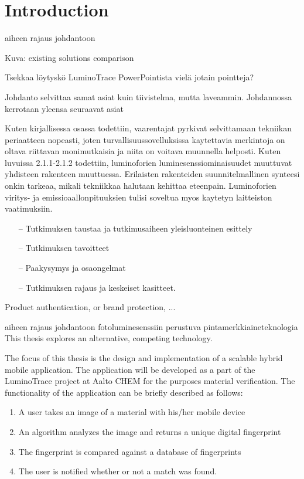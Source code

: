 \documentclass[thesis.tex]{subfiles}
\begin{document}
\chapter{Introduction}
\label{chapter:intro}

aiheen rajaus johdantoon

Kuva: existing solutions comparison

Tsekkaa löytyskö LuminoTrace PowerPointista vielä jotain pointteja?

Johdanto selvittaa samat asiat kuin tiivistelma, mutta laveammin. Johdannossa kerrotaan yleensa seuraavat asiat

Kuten kirjallisessa osassa todettiin, vaarentajat pyrkivat selvittamaan tekniikan periaatteen nopeasti, joten turvallisuussovelluksissa kaytettavia merkintoja on oltava riittavan monimutkaisia ja niita on voitava muunnella helposti. Kuten luvuissa 2.1.1-2.1.2 todettiin, luminoforien luminesenssiominaisuudet muuttuvat yhdisteen rakenteen muuttuessa. Erilaisten rakenteiden suunnitelmallinen synteesi onkin tarkeaa, mikali tekniikkaa halutaan kehittaa eteenpain. Luminoforien viritys- ja emissioaallonpituuksien tulisi soveltua myos kaytetyn laitteiston vaatimuksiin.

\begin{itemize}
\item[--]Tutkimuksen taustaa ja tutkimusaiheen yleisluonteinen esittely
\item[--]Tutkimuksen tavoitteet
\item[--]Paakysymys ja osaongelmat
\item[--]Tutkimuksen rajaus ja keskeiset kasitteet.
\end{itemize}

Product authentication, or brand protection, ...

aiheen rajaus johdantoon
fotoluminesenssiin perustuva pintamerkkiaineteknologia
This thesis explores an alternative, competing technology.

The focus of this thesis is the design and implementation of a scalable hybrid mobile application. The application will be developed as a part of the LuminoTrace project at Aalto CHEM for the purposes material verification. The functionality of the application can be briefly described as follows:

\begin{enumerate}
\item A user takes an image of a material with his/her mobile device
\item An algorithm analyzes the image and returns a unique digital fingerprint
\item The fingerprint is compared against a database of fingerprints
\item The user is notified whether or not a match was found.
\end{enumerate}
\end{document}
